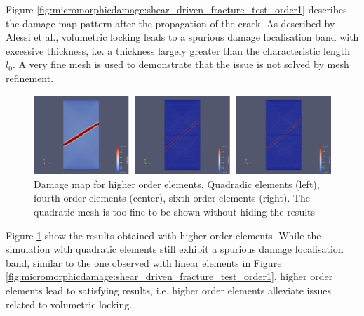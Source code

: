 Figure \ref{fig:micromorphicdamage:shear_driven_fracture_test_order1}
describes the damage map pattern after the propagation of the crack. As
described by Alessi et al., volumetric locking leads to a spurious
damage localisation band with excessive thickness, i.e. a thickness
largely greater than the characteristic length \(l_{0}\). A very fine
mesh is used to demonstrate that the issue is not solved by mesh
refinement.


\begin{figure}[H]
  \centering
  \includegraphics[width=10.cm]{../chapter_003_ef_micromorphic/figures/shear-driven-fracture-damage-results-higher-orders.pdf}
  \caption{Damage map for higher order elements. Quadradic elements (left), fourth order elements (center), sixth order elements (right). The quadratic mesh is too fine to be shown without hiding the results}
  \label{fig:micromorphicdamage:shear_driven_fracture_test_higher_order}
\end{figure}

Figure \ref{fig:micromorphicdamage:shear_driven_fracture_test_higher_order}
show the results obtained with higher order elements. While the
simulation with quadratic elements still exhibit a spurious damage
localisation band, similar to the one observed with linear elements in
Figure \ref{fig:micromorphicdamage:shear_driven_fracture_test_order1}, higher
order elements lead to satisfying results, i.e. higher order elements
alleviate issues related to volumetric locking.


